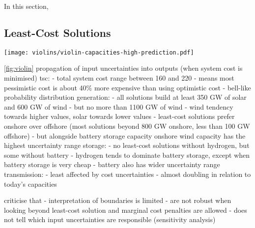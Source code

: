 In this section,

\subsection{Least-Cost Solutions}

\begin{SCfigure}
    \texttt{[image: violins/violin-capacities-high-prediction.pdf]}
    \caption{Lorem ipsum dolor sit amet, consetetur sadipscing elitr, sed diam nonumy eirmod tempor invidunt ut labore et dolore magna aliquyam erat, sed diam voluptua.}
    \label{fig:violin}
\end{SCfigure}

\cref{fig:violin}
propagation of input uncertainties into outputs (when system cost is minimised)
tsc:
- total system cost range between 160 and 220
- means most pessimistic cost is about 40\% more expensive than using optimistic cost
- bell-like probability distribution
generation:
- all solutions build at least 350 GW of solar and 600 GW of wind
- but no more than 1100 GW of wind
- wind tendency towards higher values, solar towards lower values
- least-cost solutions prefer onshore over offshore (most solutions beyond 800 GW onshore, less than 100 GW offshore)
- but alongside battery storage capacity onshore wind capacity has the highest uncertainty range
storage:
- no least-cost solutions without hydrogen, but some without battery
- hydrogen tends to dominate battery storage, except when battery storage is very cheap
- battery also has wider uncertainty range
transmission:
- least affected by cost uncertainties
- almost doubling in relation to today's capacities

criticise that
- interpretation of boundaries is limited
- are not robust when looking beyond least-cost solution and marginal cost penalties are allowed
- does not tell which input uncertainties are responsible (sensitivity analysis)


